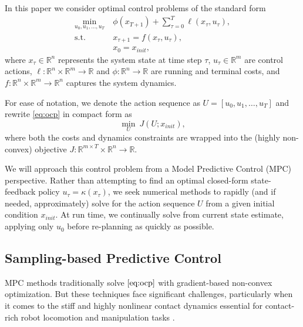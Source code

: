\documentclass[letterpaper, 10 pt]{ieeeconf}
\begin{document}
In this paper we consider optimal control problems of the standard form
\begin{subequations}\label{eq:ocp}
\begin{align}
    \min_{u_0, u_1, \dots, u_T} ~& \phi(x_{T+1}) + \sum_{\tau=0}^{T} \ell(x_\tau, u_\tau), \\
    \mathrm{s.t.} ~& x_{\tau+1} = f(x_\tau, u_\tau), \\
                   & x_0 = x_{init},
\end{align}
\end{subequations}
where $x_\tau \in \mathbb{R}^n$ represents the system state at time step $\tau$, $u_\tau \in \mathbb{R}^m$ are control actions, $\ell : \mathbb{R}^n \times \mathbb{R}^m \to \mathbb{R} $ and $\phi: \mathbb{R}^n \to \mathbb{R}$ are running and terminal costs, and $f : \mathbb{R}^n \times \mathbb{R}^m \to \mathbb{R}^n$ captures the system dynamics. 

For ease of notation, we denote the action sequence as $U = [u_0, u_1, \dots, u_T]$ and rewrite \eqref{eq:ocp} in compact form as
\begin{equation}\label{eq:ocp_compact}
    \min_{U} ~ J(U;x_{init}),
\end{equation}
where both the costs and dynamics constraints are wrapped into the (highly non-convex) objective $J : \mathbb{R}^{m \times T} \times \mathbb{R}^n \to \mathbb{R}$.

We will approach this control problem from a Model Predictive Control (MPC) perspective. Rather than attempting to find an optimal closed-form state-feedback policy $u_\tau = \kappa(x_\tau)$, we seek numerical methods to rapidly (and if needed, approximately) solve for the action sequence $U$ from a given initial condition $x_{init}$. At run time, we continually solve from current state estimate, applying only $u_0$ before re-planning as quickly as possible.

\subsection{Sampling-based Predictive Control}\label{sec:background:spc}

MPC methods traditionally solve $\eqref{eq:ocp}$ with gradient-based non-convex optimization. But these techniques face significant challenges, particularly when it comes to the stiff and highly nonlinear contact dynamics essential for contact-rich robot locomotion and manipulation tasks \cite{wensing2023optimization}. 
\end{document}
